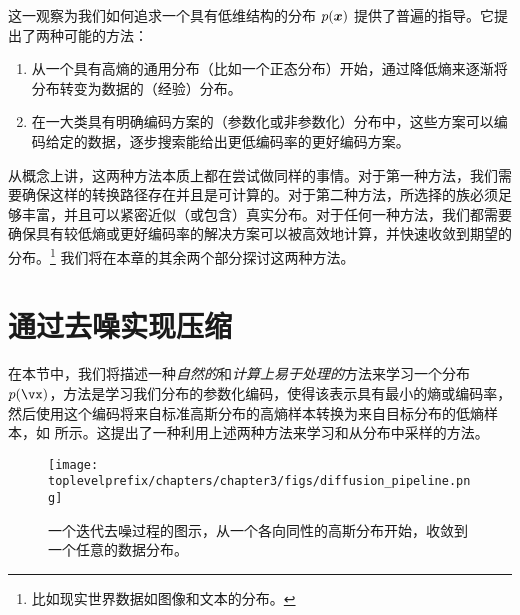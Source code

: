 \documentclass[../../book-main_zh.tex]{subfiles}
\begin{document}
这一观察为我们如何追求一个具有低维结构的分布 $p(\bm{x})$ 提供了普遍的指导。它提出了两种可能的方法：
\begin{enumerate}
	\item 从一个具有高熵的通用分布（比如一个正态分布）开始，通过降低熵来逐渐将分布转变为数据的（经验）分布。
	\item 在一大类具有明确编码方案的（参数化或非参数化）分布中，这些方案可以编码给定的数据，逐步搜索能给出更低编码率的更好编码方案。
\end{enumerate}
从概念上讲，这两种方法本质上都在尝试做同样的事情。对于第一种方法，我们需要确保这样的转换路径存在并且是可计算的。对于第二种方法，所选择的族必须足够丰富，并且可以紧密近似（或包含）真实分布。对于任何一种方法，我们都需要确保具有较低熵或更好编码率的解决方案可以被高效地计算，并快速收敛到期望的分布。\footnote{比如现实世界数据如图像和文本的分布。} 我们将在本章的其余两个部分探讨这两种方法。%

\section{通过去噪实现压缩}\label{sub:compression_denoising}

在本节中，我们将描述一种\textit{自然的}和\textit{计算上易于处理的}方法来学习一个分布 \(p(\vx)\)，方法是学习我们分布的参数化编码，使得该表示具有最小的熵或编码率，然后使用这个编码将来自标准高斯分布的高熵样本转换为来自目标分布的低熵样本，如  所示。这提出了一种利用上述两种方法来学习和从分布中采样的方法。

\begin{figure}[t]
	\centering
	\texttt{[image: \\toplevelprefix/chapters/chapter3/figs/diffusion\_pipeline.png]}
	\caption{一个迭代去噪过程的图示，从一个各向同性的高斯分布开始，收敛到一个任意的数据分布。}
	\label{fig:diffusion-chapter3}
\end{figure}
\end{document}
